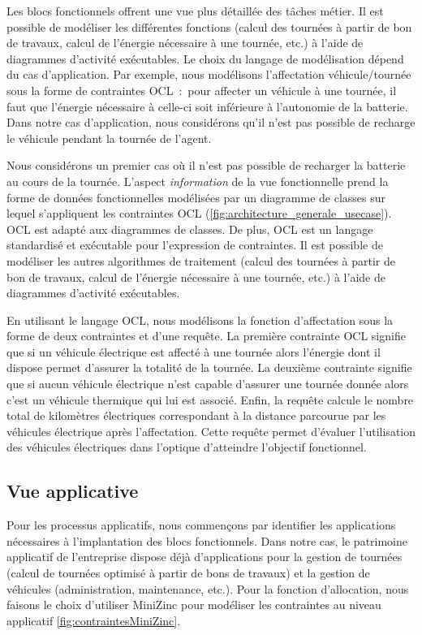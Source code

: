 Les blocs fonctionnels offrent une vue plus détaillée des tâches métier. Il est possible de modéliser les différentes fonctions (calcul des tournées à partir de bon de travaux, calcul de l'énergie nécessaire à une tournée, etc.) à l'aide de diagrammes d'activité exécutables. Le choix du langage de modélisation dépend du cas d'application. Par exemple, nous modélisons l'affectation véhicule/tournée sous la forme de contraintes OCL~:~pour affecter un véhicule à une tournée, il faut que l'énergie nécessaire à celle-ci soit inférieure à l'autonomie de la batterie. Dans notre cas d'application, nous considérons qu'il n'est pas possible de recharge le véhicule pendant la tournée de l'agent.

Nous considérons un premier cas où il n'est pas possible de recharger la batterie au cours de la tournée. L'aspect \emph{information} de la vue fonctionnelle prend la forme de données fonctionnelles  modélisées par un diagramme de classes sur lequel s'appliquent les contraintes OCL (\ref{fig:architecture_generale_usecase}). OCL est adapté aux diagrammes de classes. De plus, OCL est un langage standardisé et exécutable pour l'expression de contraintes. Il est possible de modéliser les autres algorithmes de traitement (calcul des tournées à partir de bon de travaux, calcul de l'énergie nécessaire à une tournée, etc.) à l'aide de diagrammes d'activité exécutables.

En utilisant le langage OCL, nous modélisons la fonction d'affectation sous la forme de deux contraintes et d'une requête. La première contrainte OCL signifie que si un véhicule électrique est affecté à une tournée alors l'énergie dont il dispose permet d'assurer la totalité de la tournée.
La deuxième contrainte signifie que si aucun véhicule électrique n'est capable d'assurer une tournée donnée alors c'est un véhicule thermique qui lui est associé. Enfin, la requête calcule le nombre total de kilomètres électriques correspondant à la distance parcourue par les véhicules électrique après l'affectation. Cette requête permet d'évaluer l'utilisation  des véhicules électriques dans l'optique d'atteindre l'objectif fonctionnel.



\subsection{Vue applicative}

Pour les processus applicatifs, nous commençons par identifier 
les applications nécessaires à l'implantation des blocs fonctionnels. Dans notre cas, le patrimoine applicatif de l'entreprise dispose déjà d'applications pour la gestion de tournées (calcul de tournées optimisé à partir de bons de travaux) et la gestion de véhicules (administration, maintenance, etc.). Pour la fonction d'allocation, nous faisons le choix d'utiliser MiniZinc pour modéliser les contraintes au niveau applicatif \ref{fig:contraintesMiniZinc}. 

